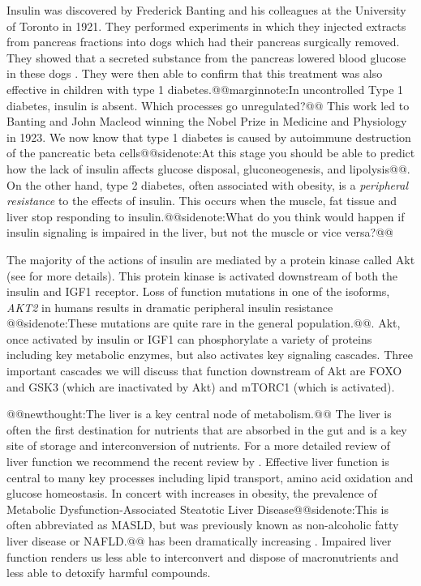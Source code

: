 \documentclass{tufte-handout}
\makeatletter
\def\newthought#1{@@newthought:#1@@}
\def\marginnote#1{@@marginnote:#1@@}
\def\sidenote#1{@@sidenote:#1@@}
\makeatother
\begin{document}
Insulin was discovered by Frederick Banting and his colleagues at the University of Toronto in 1921.  They performed experiments in which they injected extracts from pancreas fractions into dogs which had their pancreas surgically removed.  They showed that a secreted substance from the pancreas lowered blood glucose in these dogs \citep{Banting1922b}.  They were then able to confirm that this treatment was also effective in children with type 1 diabetes.\marginnote{In uncontrolled Type 1 diabetes, insulin is absent. Which processes go unregulated?}  This work led to Banting and John Macleod winning the Nobel Prize in Medicine and Physiology in 1923.  We now know that type 1 diabetes is caused by autoimmune destruction of the pancreatic beta cells\sidenote{At this stage you should be able to predict how the lack of insulin affects glucose disposal, gluconeogenesis, and lipolysis}.  On the other hand, type 2 diabetes, often associated with obesity, is a \emph{peripheral resistance} to the effects of insulin.  This occurs when the muscle, fat tissue and liver stop responding to insulin.\sidenote{What do you think would happen if insulin signaling is impaired in the liver, but not the muscle or vice versa?}

The majority of the actions of insulin are mediated by a protein kinase called Akt (see \citep{Manning2007} for more details).  This protein kinase is activated downstream of both the insulin and IGF1 receptor.  Loss of function mutations in one of the isoforms, \textit{AKT2} in humans results in dramatic peripheral insulin resistance \citep{George2004}\sidenote{These mutations are quite rare in the general population.}.  Akt, once activated by insulin or IGF1 can phosphorylate a variety of proteins including key metabolic enzymes, but also activates key signaling cascades.  Three important cascades we will discuss that function downstream of Akt are FOXO and GSK3 (which are inactivated by Akt) and mTORC1 (which is activated).  

\newthought{The liver is a key central node of metabolism.}  The liver is often the first destination for nutrients that are absorbed in the gut and is a key site of storage and interconversion of nutrients.  For a more detailed review of liver function we recommend the recent review by \citet{Trefts2017}.  Effective liver function is central to many key processes including lipid transport, amino acid oxidation and glucose homeostasis.  In concert with increases in obesity, the prevalence of Metabolic Dysfunction-Associated Steatotic Liver Disease\sidenote{This is often abbreviated as MASLD\nomenclature{MASLD}{Metabolic Dysfunction-Associated Steatotic Liver Disease}, but was previously known as non-alcoholic fatty liver disease or NAFLD.} has been dramatically increasing \citep{Hashimoto2011}.  Impaired liver function renders us less able to interconvert and dispose of macronutrients and less able to detoxify harmful compounds.
\end{document}
